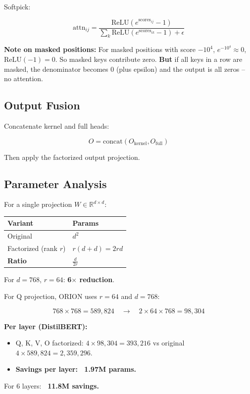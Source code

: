 Softpick:

\[
\text{attn}_{ij} = \frac{\text{ReLU}(e^{\text{scores}_{ij}} - 1)}{\sum_k \text{ReLU}(e^{\text{scores}_{ik}} - 1) + \epsilon}
\tag{4.9}
\]

\textbf{Note on masked positions:} For masked positions with score $-10^4$, 
$e^{-10^4} \approx 0$, $\text{ReLU}(-1) = 0$. So masked keys contribute 
zero. \textbf{But} if all keys in a row are masked, the denominator becomes 0 
(plus epsilon) and the output is all zeros -- no attention.

\subsection{Output Fusion}

Concatenate kernel and full heads:

\[
O = \text{concat}(O_{\text{kernel}}, O_{\text{full}})
\tag{4.10}
\]

Then apply the factorized output projection.

\subsection{Parameter Analysis}

For a single projection $W \in \mathbb{R}^{d \times d}$:

\begin{table}[H]
\centering
\small
\begin{tabular}{ll}
\toprule
\textbf{Variant} & \textbf{Params} \\
\midrule
Original & $d^2$ \\
Factorized (rank $r$) & $r(d + d) = 2rd$ \\
\textbf{Ratio} & $\frac{d}{2r}$ \\
\bottomrule
\end{tabular}
\end{table}

For $d = 768$, $r = 64$: \textbf{6$\times$ reduction}.

For Q projection, ORION uses $r = 64$ and $d = 768$:

\[
768 \times 768 = 589,824 \quad \rightarrow \quad 2 \times 64 \times 768 = 98,304
\]

\textbf{Per layer (DistilBERT):}
\begin{itemize}
\item Q, K, V, O factorized: $4 \times 98,304 = 393,216$ vs original $4 \times 589,824 = 2,359,296$.
\item \textbf{Savings per layer: ~1.97M params.}

\end{itemize}
For 6 layers: \textbf{~11.8M savings.}

